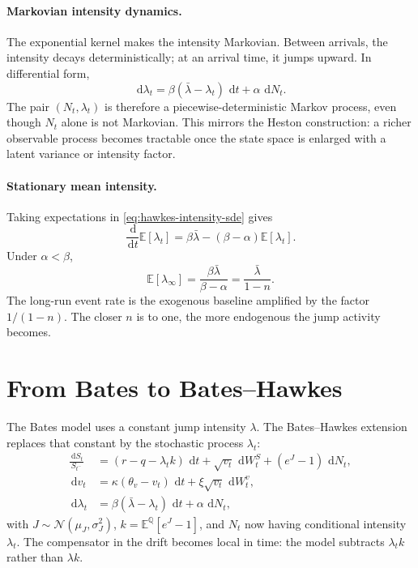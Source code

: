 \documentclass[a4paper,10pt,titlepage,oneside,openany]{book}
\theoremstyle{plain}
\theoremstyle{definition}
\theoremstyle{remark}
\newcommand{\E}{\mathbb{E}}
\newcommand{\Q}{\mathbb{Q}}
\newcommand{\dd}{\,\mathrm{d}}
\begin{document}
\paragraph{Markovian intensity dynamics.}
The exponential kernel makes the intensity Markovian. Between arrivals, the intensity decays deterministically; at an arrival time, it jumps upward. In differential form,
\begin{equation}
    \dd\lambda_t
    =
    \beta(\bar{\lambda}-\lambda_t)\,\dd t+\alpha\,\dd N_t.
    \label{eq:hawkes-intensity-sde}
\end{equation}
The pair \((N_t,\lambda_t)\) is therefore a piecewise-deterministic Markov process, even though \(N_t\) alone is not Markovian. This mirrors the Heston construction: a richer observable process becomes tractable once the state space is enlarged with a latent variance or intensity factor.

\paragraph{Stationary mean intensity.}
Taking expectations in \eqref{eq:hawkes-intensity-sde} gives
\begin{equation}
    \frac{\dd}{\dd t}\E[\lambda_t]
    =
    \beta\bar{\lambda}-(\beta-\alpha)\E[\lambda_t].
\end{equation}
Under \(\alpha<\beta\),
\begin{equation}
    \E[\lambda_\infty]
    =
    \frac{\beta\bar{\lambda}}{\beta-\alpha}
    =
    \frac{\bar{\lambda}}{1-n}.
    \label{eq:hawkes-stationary-mean}
\end{equation}
The long-run event rate is the exogenous baseline amplified by the factor \(1/(1-n)\). The closer \(n\) is to one, the more endogenous the jump activity becomes.

\section{From Bates to Bates--Hawkes}

The Bates model uses a constant jump intensity \(\lambda\). The Bates--Hawkes extension replaces that constant by the stochastic process \(\lambda_t\):
\begin{align}
    \frac{\dd S_t}{S_{t^-}}
    &=
    (r-q-\lambda_t k)\,\dd t
    +\sqrt{v_t}\,\dd W_t^S
    +(e^J-1)\,\dd N_t,\\
    \dd v_t
    &=
    \kappa(\theta_v-v_t)\,\dd t+\xi\sqrt{v_t}\,\dd W_t^v,\\
    \dd\lambda_t
    &=
    \beta(\bar{\lambda}-\lambda_t)\,\dd t+\alpha\,\dd N_t,
    \label{eq:bates-hawkes-system}
\end{align}
with \(J\sim\mathcal{N}(\mu_J,\sigma_J^2)\), \(k=\E^\Q[e^J-1]\), and \(N_t\) now having conditional intensity \(\lambda_t\). The compensator in the drift becomes local in time: the model subtracts \(\lambda_t k\) rather than \(\lambda k\).
\end{document}
